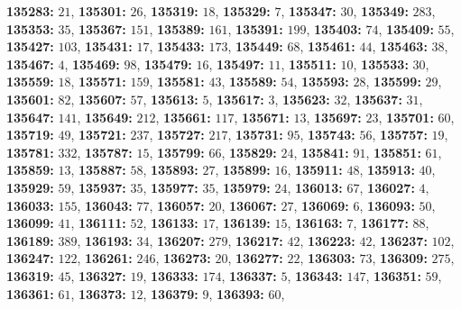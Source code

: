 \textsf{\bfseries 135283:} $21$, \textsf{\bfseries 135301:} $26$, \textsf{\bfseries 135319:} $18$, \textsf{\bfseries 135329:} $7$, \textsf{\bfseries 135347:} $30$, \textsf{\bfseries 135349:} $283$, \textsf{\bfseries 135353:} $35$, \textsf{\bfseries 135367:} $151$, \textsf{\bfseries 135389:} $161$, \textsf{\bfseries 135391:} $199$, \textsf{\bfseries 135403:} $74$, \textsf{\bfseries 135409:} $55$, \textsf{\bfseries 135427:} $103$, \textsf{\bfseries 135431:} $17$, \textsf{\bfseries 135433:} $173$, \textsf{\bfseries 135449:} $68$, \textsf{\bfseries 135461:} $44$, \textsf{\bfseries 135463:} $38$, \textsf{\bfseries 135467:} $4$, \textsf{\bfseries 135469:} $98$, \textsf{\bfseries 135479:} $16$, \textsf{\bfseries 135497:} $11$, \textsf{\bfseries 135511:} $10$, \textsf{\bfseries 135533:} $30$, \textsf{\bfseries 135559:} $18$, \textsf{\bfseries 135571:} $159$, \textsf{\bfseries 135581:} $43$, \textsf{\bfseries 135589:} $54$, \textsf{\bfseries 135593:} $28$, \textsf{\bfseries 135599:} $29$, \textsf{\bfseries 135601:} $82$, \textsf{\bfseries 135607:} $57$, \textsf{\bfseries 135613:} $5$, \textsf{\bfseries 135617:} $3$, \textsf{\bfseries 135623:} $32$, \textsf{\bfseries 135637:} $31$, \textsf{\bfseries 135647:} $141$, \textsf{\bfseries 135649:} $212$, \textsf{\bfseries 135661:} $117$, \textsf{\bfseries 135671:} $13$, \textsf{\bfseries 135697:} $23$, \textsf{\bfseries 135701:} $60$, \textsf{\bfseries 135719:} $49$, \textsf{\bfseries 135721:} $237$, \textsf{\bfseries 135727:} $217$, \textsf{\bfseries 135731:} $95$, \textsf{\bfseries 135743:} $56$, \textsf{\bfseries 135757:} $19$, \textsf{\bfseries 135781:} $332$, \textsf{\bfseries 135787:} $15$, \textsf{\bfseries 135799:} $66$, \textsf{\bfseries 135829:} $24$, \textsf{\bfseries 135841:} $91$, \textsf{\bfseries 135851:} $61$, \textsf{\bfseries 135859:} $13$, \textsf{\bfseries 135887:} $58$, \textsf{\bfseries 135893:} $27$, \textsf{\bfseries 135899:} $16$, \textsf{\bfseries 135911:} $48$, \textsf{\bfseries 135913:} $40$, \textsf{\bfseries 135929:} $59$, \textsf{\bfseries 135937:} $35$, \textsf{\bfseries 135977:} $35$, \textsf{\bfseries 135979:} $24$, \textsf{\bfseries 136013:} $67$, \textsf{\bfseries 136027:} $4$, \textsf{\bfseries 136033:} $155$, \textsf{\bfseries 136043:} $77$, \textsf{\bfseries 136057:} $20$, \textsf{\bfseries 136067:} $27$, \textsf{\bfseries 136069:} $6$, \textsf{\bfseries 136093:} $50$, \textsf{\bfseries 136099:} $41$, \textsf{\bfseries 136111:} $52$, \textsf{\bfseries 136133:} $17$, \textsf{\bfseries 136139:} $15$, \textsf{\bfseries 136163:} $7$, \textsf{\bfseries 136177:} $88$, \textsf{\bfseries 136189:} $389$, \textsf{\bfseries 136193:} $34$, \textsf{\bfseries 136207:} $279$, \textsf{\bfseries 136217:} $42$, \textsf{\bfseries 136223:} $42$, \textsf{\bfseries 136237:} $102$, \textsf{\bfseries 136247:} $122$, \textsf{\bfseries 136261:} $246$, \textsf{\bfseries 136273:} $20$, \textsf{\bfseries 136277:} $22$, \textsf{\bfseries 136303:} $73$, \textsf{\bfseries 136309:} $275$, \textsf{\bfseries 136319:} $45$, \textsf{\bfseries 136327:} $19$, \textsf{\bfseries 136333:} $174$, \textsf{\bfseries 136337:} $5$, \textsf{\bfseries 136343:} $147$, \textsf{\bfseries 136351:} $59$, \textsf{\bfseries 136361:} $61$, \textsf{\bfseries 136373:} $12$, \textsf{\bfseries 136379:} $9$, \textsf{\bfseries 136393:} $60$, 
